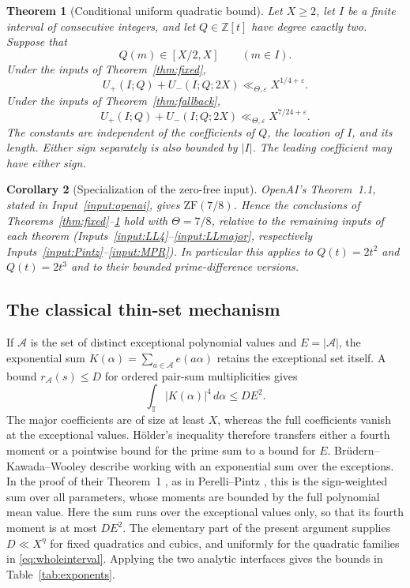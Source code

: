 \documentclass[11pt]{article}
\newtheorem{theorem}{Theorem}[section]
\newtheorem{corollary}[theorem]{Corollary}
\theoremstyle{definition}
\theoremstyle{remark}
\numberwithin{equation}{section}
\newcommand{\eps}{\varepsilon}
\newcommand{\Z}{\mathbb Z}
\newcommand{\T}{\mathbb T}
\newcommand{\A}{\mathcal A}
\begin{document}
\begin{theorem}[Conditional uniform quadratic bound]\label{thm:uniform}
Let $X\ge2$, let $I$ be a finite interval of consecutive integers, and
let $Q\in\Z[t]$ have degree exactly two. Suppose that
\begin{equation}\label{eq:wholeinterval}
                 Q(m)\in[X/2,X]\qquad(m\in I).
\end{equation}
Under the inputs of Theorem~\ref{thm:fixed},
\begin{equation}\label{eq:uniformLL}
 U_+(I;Q)+U_-(I;Q;2X)\ll_{\Theta,\eps}X^{1/4+\eps}.
\end{equation}
Under the inputs of Theorem~\ref{thm:fallback},
\begin{equation}\label{eq:uniformfallback}
 U_+(I;Q)+U_-(I;Q;2X)\ll_{\Theta,\eps}X^{7/24+\eps}.
\end{equation}
The constants are independent of the coefficients of $Q$, the location
of $I$, and its length. Either sign separately is also bounded by $|I|$.
The leading coefficient may have either sign.
\end{theorem}

\begin{corollary}[Specialization of the zero-free input]\label{cor:openai}
OpenAI's Theorem~1.1, stated in Input~\ref{input:openai}, gives
$\mathrm{ZF}(7/8)$. Hence the conclusions of
Theorems~\ref{thm:fixed}--\ref{thm:uniform} hold with $\Theta=7/8$,
relative to the remaining inputs of each theorem
(Inputs~\ref{input:LL4}--\ref{input:LLmajor}, respectively
Inputs~\ref{input:Pintz}--\ref{input:MPR}). In particular this applies
to $Q(t)=2t^2$ and $Q(t)=2t^3$ and to their bounded prime-difference versions.
\end{corollary}

\subsection{The classical thin-set mechanism}

If $\A$ is the set of distinct exceptional polynomial values and
$E=|\A|$, the exponential sum
$K(\alpha)=\sum_{a\in\A}e(a\alpha)$ retains the exceptional set itself.
A bound $r_\A(s)\le D$ for ordered pair-sum multiplicities gives
\[
 \int_\T|K(\alpha)|^4\,d\alpha\le DE^2.
\]
The major coefficients are of size at least $X$, whereas the full
coefficients vanish at the exceptional values. H\"older's inequality
therefore transfers either a fourth moment or a pointwise bound for the
prime sum to a bound for $E$. Br\"udern--Kawada--Wooley
\cite[Introduction]{BKW} describe working with an exponential sum over
the exceptions. In the proof of their Theorem~1 \cite[\S2, (5)]{BKW},
as in Perelli--Pintz \cite[(3.6)--(3.10)]{PP}, this is the sign-weighted
sum over all parameters, whose moments are bounded by the full polynomial
mean value. Here the sum runs over the exceptional values only, so that
its fourth moment is at most $DE^2$.
The elementary part of the present argument supplies $D\ll X^\eta$
for fixed quadratics and cubics, and uniformly for the quadratic
families in \eqref{eq:wholeinterval}. Applying the two analytic
interfaces gives the bounds in Table~\ref{tab:exponents}.
\end{document}
